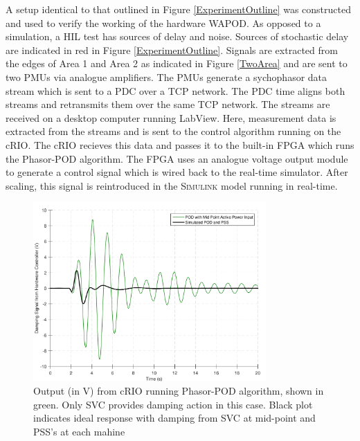 \documentclass[conference]{IEEEtran}
\begin{document}
A setup identical to that outlined in Figure \ref{ExperimentOutline} was constructed and used to verify the working of the hardware WAPOD. As opposed to a simulation, a HIL test has sources of delay and noise. Sources of stochastic delay are indicated in red in Figure \ref{ExperimentOutline}. Signals are extracted from the edges of Area 1 and Area 2 as indicated in Figure \ref{TwoArea} and are sent to two PMUs via analogue amplifiers. The PMUs generate a sychophasor data stream which is sent to a PDC over a TCP network. The PDC time aligns both streams and retransmits them over the same TCP network. The streams are received on a desktop computer running LabView. Here, measurement data is extracted from the streams and is sent to the control algorithm running on the cRIO. The cRIO recieves this data and passes it to the built-in FPGA which runs the Phasor-POD algorithm. The FPGA uses an analogue voltage output module to generate a control signal which is wired back to the real-time simulator. After scaling, this signal is reintroduced in the \textsc{Simulink} model running in real-time.\\
\begin{figure}[!h]
\includegraphics[width=3.5in]{SVC_ResponseComparison_Labelled.pdf} 
\caption{Output (in V) from cRIO running Phasor-POD algorithm, shown in green. Only SVC provides damping action in this case. Black plot indicates ideal response with damping from SVC at mid-point and PSS's at each mahine}
\label{HILGraph}
\end{figure}
\end{document}
